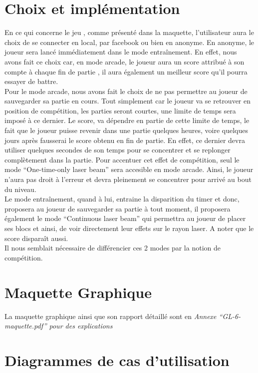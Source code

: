 \documentclass[a4paper,10pt]{article}
\begin{document}
\section{Choix et implémentation}
En ce qui concerne le jeu , comme présenté dans la maquette, l'utilisateur aura le choix de se connecter en local, par facebook ou bien en anonyme. En anonyme,
le joueur sera lancé immédiatement dans le mode entraînement. En effet, nous avons fait ce choix car, en mode arcade, le joueur aura un score attribué à son
 compte à chaque fin de partie , il aura également un meilleur score qu'il pourra essayer de battre. 
\\
Pour le mode arcade, nous avons fait le choix de ne pas permettre au joueur de sauvegarder sa partie en cours. Tout simplement car le joueur va se retrouver
en position de compétition, les parties seront courtes, une limite de temps sera imposé à ce dernier. Le score, va dépendre en partie de cette limite de temps,
le fait que le joueur puisse revenir dans une partie quelques heures, voire quelques jours après fausserai le score obtenu en fin de partie. En effet, ce dernier
devra utiliser quelques secondes de son temps pour se concentrer et se replonger complètement dans la partie. Pour accentuer cet effet de compétition, seul le mode
``One-time-only laser beam'' sera accesible en mode arcade. Ainsi, le joueur n'aura pas droit à l'erreur et devra pleinement se concentrer pour arrivé au bout du niveau.
\\
Le mode entraînement, quand à lui, entraine la disparition du timer et donc, proposera au joueur de sauvegarder sa partie à tout moment, 
il proposera également le mode ``Continuous laser beam'' qui permettra au joueur de placer ses blocs et ainsi, de voir directement leur effets sur le rayon laser.
A noter que le score disparaît aussi.
\\
Il nous semblait nécessaire de différencier ces 2 modes par la notion de compétition. 

\section{Maquette Graphique}
La maquette graphique ainsi que son rapport détaillé sont en \textit{Annexe ``GL-6-maquette.pdf'' pour des explications}

\pagebreak

\section{Diagrammes de cas d'utilisation}
\end{document}
